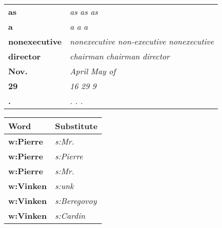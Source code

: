 \begin{table}[h]
\begin{tabular}{|ll|}
\textbf{as} & \textit{as}  \textit{as}  \textit{as}\\
\textbf{a} & \textit{a}  \textit{a}  \textit{a}\\
\textbf{nonexecutive} & \textit{nonexecutive}  \textit{non-executive}  \textit{nonexecutive}\\
\textbf{director} & \textit{chairman}  \textit{chairman}  \textit{director}\\
\textbf{Nov.} & \textit{April}  \textit{May}  \textit{of}\\
\textbf{29} & \textit{16}  \textit{29}  \textit{9}\\
\textbf{.} & \textit{.}  \textit{.}  \textit{.}\\
\hline
\end{tabular}
\quad
\begin{tabular}{|ll|}
\hline
\textbf{Word} & \textbf{Substitute}\\
\hline
\textbf{w:Pierre} & \textit{s:Mr.}\\
\textbf{w:Pierre} & \textit{s:Pierre}\\
\textbf{w:Pierre} & \textit{s:Mr.}\\
\textbf{w:Vinken} & \textit{s:unk}\\
\textbf{w:Vinken} & \textit{s:Beregovoy}\\
\textbf{w:Vinken} & \textit{s:Cardin}\\

\end{tabular}
\end{table}
